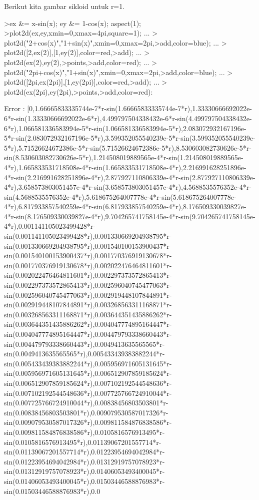\documentclass[a4paper,10pt]{article}
\begin{document}
\begin{eulernotebook}
\begin{eulercomment}
\begin{eulercomment}
\begin{eulercomment}
\begin{eulercomment}
\begin{eulercomment}
\begin{eulercomment}
\begin{eulercomment}
\begin{eulercomment}
\begin{euleroutput}
\end{euleroutput}
\begin{eulercomment}
Berikut kita gambar sikloid untuk r=1.
\end{eulercomment}
\begin{eulerprompt}
>ex &= x-sin(x); ey &= 1-cos(x); aspect(1);
>plot2d(ex,ey,xmin=0,xmax=4pi,square=1); ...
>  plot2d("2+cos(x)","1+sin(x)",xmin=0,xmax=2pi,>add,color=blue); ...
>  plot2d([2,ex(2)],[1,ey(2)],color=red,>add); ...
>  plot2d(ex(2),ey(2),>points,>add,color=red); ...
>  plot2d("2pi+cos(x)","1+sin(x)",xmin=0,xmax=2pi,>add,color=blue); ...
>  plot2d([2pi,ex(2pi)],[1,ey(2pi)],color=red,>add);  ...
>  plot2d(ex(2pi),ey(2pi),>points,>add,color=red):
\end{eulerprompt}
\begin{euleroutput}
  Error : [0,1.66665833335744e-7*r-sin(1.66665833335744e-7*r),1.33330666692022e-6*r-sin(1.33330666692022e-6*r),4.499797504338432e-6*r-sin(4.499797504338432e-6*r),1.066581336583994e-5*r-sin(1.066581336583994e-5*r),2.083072932167196e-5*r-sin(2.083072932167196e-5*r),3.599352055540239e-5*r-sin(3.599352055540239e-5*r),5.71526624672386e-5*r-sin(5.71526624672386e-5*r),8.530603082730626e-5*r-sin(8.530603082730626e-5*r),1.214508019889565e-4*r-sin(1.214508019889565e-4*r),1.665833531718508e-4*r-sin(1.665833531718508e-4*r),2.216991628251896e-4*r-sin(2.216991628251896e-4*r),2.877927110806339e-4*r-sin(2.877927110806339e-4*r),3.658573803051457e-4*r-sin(3.658573803051457e-4*r),4.5688535576352e-4*r-sin(4.5688535576352e-4*r),5.618675264007778e-4*r-sin(5.618675264007778e-4*r),6.817933857540259e-4*r-sin(6.817933857540259e-4*r),8.176509330039827e-4*r-sin(8.176509330039827e-4*r),9.704265741758145e-4*r-sin(9.704265741758145e-4*r),0.001141105023499428*r-sin(0.001141105023499428*r),0.001330669204938795*r-sin(0.001330669204938795*r),0.001540100153900437*r-sin(0.001540100153900437*r),0.001770376919130678*r-sin(0.001770376919130678*r),0.002022476464811601*r-sin(0.002022476464811601*r),0.002297373572865413*r-sin(0.002297373572865413*r),0.002596040745477063*r-sin(0.002596040745477063*r),0.002919448107844891*r-sin(0.002919448107844891*r),0.003268563311168871*r-sin(0.003268563311168871*r),0.003644351435886262*r-sin(0.003644351435886262*r),0.004047774895164447*r-sin(0.004047774895164447*r),0.004479793338660443*r-sin(0.004479793338660443*r),0.0049413635565565*r-sin(0.0049413635565565*r),0.005433439383882244*r-sin(0.005433439383882244*r),0.005956971605131645*r-sin(0.005956971605131645*r),0.006512907859185624*r-sin(0.006512907859185624*r),0.007102192544548636*r-sin(0.007102192544548636*r),0.007725766724910044*r-sin(0.007725766724910044*r),0.00838456803503801*r-sin(0.00838456803503801*r),0.009079530587017326*r-sin(0.009079530587017326*r),0.009811584876838586*r-sin(0.009811584876838586*r),0.0105816576913495*r-sin(0.0105816576913495*r),0.01139067201557714*r-sin(0.01139067201557714*r),0.01223954694042984*r-sin(0.01223954694042984*r),0.01312919757078923*r-sin(0.01312919757078923*r),0.01406053493400045*r-sin(0.01406053493400045*r),0.01503446588876983*r-sin(0.01503446588876983*r),0.0
\end{euleroutput}
\end{eulercomment}
\end{eulercomment}
\end{eulercomment}
\end{eulercomment}
\end{eulercomment}
\end{eulercomment}
\end{eulercomment}
\end{eulercomment}
\end{eulernotebook}
\end{document}
